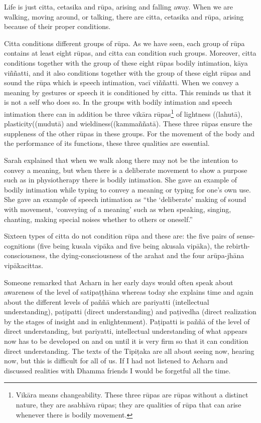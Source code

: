 \documentclass{book}
\begin{document}
Life is just citta, cetasika and rūpa,
arising and falling away. When we are walking, moving around, or
talking, there are citta, cetasika and rūpa, arising because of their
proper conditions. 

Citta conditions different groups of rūpa.
As we have seen, each group of rūpa contains at least eight rūpas, and
citta can condition such groups. Moreover, citta conditions together
with the group of these eight rūpas bodily intimation, kāya
viññatti, and it also conditions
together with the group of these eight
rūpas and sound the rūpa which is speech
intimation, vacī viññatti. When we convey a meaning by gestures or
speech it is conditioned by citta. This reminds us that it is not a self
who does so. In the groups with bodily intimation and speech intimation
there can in addition be three vikāra
rūpas\footnote{Vikāra means changeability. These three
rūpas are
rūpas without a distinct nature,
they are asabhāva
rūpas; they are qualities of
rūpa that can arise whenever there is bodily movement.} of
lightness ((lahutā),
plasticity((mudutā) and
wieldiness((kammaññatā). These three rūpas
ensure the suppleness of the other rūpas in these groups.
For the movement of the body and the
performance of its functions, these three qualities are essential.

Sarah explained that when we walk along
there may not be the intention to convey a meaning, but when there is a
deliberate movement to show a purpose such as in physiotherapy there is
bodily intimation. She gave an example of bodily intimation while typing
to convey a meaning or typing for one's own use. She gave an
example of speech intimation as ``the
`deliberate' making of sound with movement, `conveying of a meaning'
such as when speaking, singing, chanting, making special noises whether
to others or oneself.'' 

Sixteen types of citta do not condition rūpa
and these are: the five pairs of sense-cognitions (five being kusala
vipāka and five being akusala vipāka), the rebirth-consciousness, the
dying-consciousness of the arahat and the four arūpa-jhāna vipākacittas.


Someone remarked that Acharn in her early
days would often speak about awareness of the level of satipaṭṭhāna
whereas today she explains time and again about the different levels of
paññā which are pariyatti (intellectual understanding), paṭipatti
(direct understanding) and paṭivedha (direct realization by the stages
of insight and in enlightenment). Paṭipatti is paññā of the level of
direct understanding, but pariyatti, intellectual understanding of what
appears now has to be developed on and on until it is very firm so that
it can condition direct understanding. The texts of the Tipiṭaka are all
about seeing now, hearing now, but this is difficult for all of us. If I
had not listened to Acharn and discussed realities with Dhamma friends I
would be forgetful all the time. 
\end{document}
